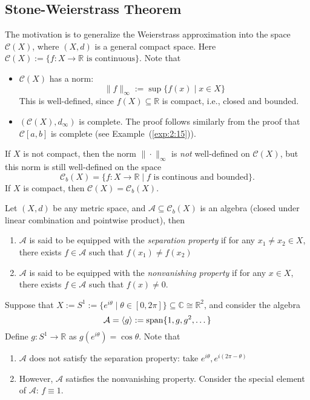 \subsection{Stone-Weierstrass Theorem}
The motivation is to generalize the Weierstrass approximation into the space $\mathcal{C}(X)$, where $(X,d)$ is a general compact space. 
Here $\mathcal{C}(X):=\{f:X\to\mathbb{R}\text{ is continuous}\}$. Note that
\begin{itemize}
\item
$\mathcal{C}(X)$ has a norm:
\[
\|f\|_\infty :=\sup\{f(x)\mid x\in X\}
\]
This is well-defined, since $f(X)\subseteq\mathbb{R}$ is compact, i.e., closed and bounded.
\item
$(\mathcal{C}(X),d_\infty)$ is complete. The proof follows similarly from the proof that $\mathcal{C}[a,b]$ is complete (see Example~(\ref{exp:2:15})).
\end{itemize}
\begin{remark}
If $X$ is not compact, then the norm $\|\cdot\|_\infty$ is \emph{not} well-defined on $\mathcal{C}(X)$, but this norm is still well-defined on the space
\[
\mathcal{C}_{b}(X)=\{f:X\to\mathbb{R}\mid \text{$f$ is continous and bounded}\}.
\]
If $X$ is compact, then $\mathcal{C}(X)=\mathcal{C}_{b}(X)$.
\end{remark}

\begin{definition}
Let $(X,d)$ be any metric space, and $\mathcal{A}\subseteq\mathcal{C}_b(X)$ is an algebra (closed under linear combination and pointwise product), then 
\begin{enumerate}
\item
$\mathcal{A}$ is said to be equipped with the \emph{separation property} if for any $x_1\ne x_2\in X$, there exists $f\in\mathcal{A}$ such that $f(x_1)\ne f(x_2)$
\item
$\mathcal{A}$ is said to be equipped with the \emph{nonvanishing property} if for any $x\in X$, there exists $f\in\mathcal{A}$ such that $f(x)\ne0$.
\end{enumerate}
\end{definition}
\begin{example}
Suppose that $X:=S^1:=\{e^{i\theta}\mid\theta\in[0,2\pi]\}\subseteq\mathbb{C}\cong\mathbb{R}^2$, and consider the algebra
\[
\mathcal{A}=\langle g\rangle:=\operatorname{span}\{1,g,g^2,\dots\}
\]
Define $g:S^1\to\mathbb{R}$ as $g(e^{i\theta}) = \cos\theta$. Note that
\begin{enumerate}
\item
$\mathcal{A}$ does not satisfy the separation property: take $e^{i\theta},e^{i(2\pi-\theta)}$
\item
However, $\mathcal{A}$ satisfies the nonvanishing property. Consider the special element of $\mathcal{A}$: $f\equiv1$.
\end{enumerate}
\end{example}


